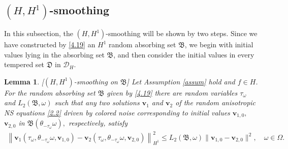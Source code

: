 \documentclass{elsarticle}
\newtheorem{lemma}[theorem]{Lemma}
\theoremstyle{definition}
\numberwithin{equation}{section}
\newcommand{\D}{\mathcal{D}}
\begin{document}
\subsection{$(H,H^1)$-smoothing}

In this subsection, the $(H,H^1)$-smoothing will be shown  by two steps. Since  we have constructed  by   \eqref{4.19} an $H^1$ random absorbing set $\mathfrak B$, we begin with initial values lying  in the absorbing set $\mathfrak B$, and then consider the  initial values  in every tempered set $\mathfrak D $ in $\D_H$.


\begin{lemma}\label{lemma5.2}[$(H,H^1)$-smoothing on $\mathfrak B$]
 Let Assumption \ref{assum} hold and $f\in H$. For   the random absorbing set $\mathfrak B$ given by \eqref{4.19}     there are  random variables $\tau_\omega$ and $L_2(\mathfrak B,\omega) $ such that any
 two solutions $\textbf{v}_1$ and $\textbf{v}_2$ of the random anisotropic  NS equations \eqref{2.2} driven by colored noise corresponding to initial values  $\textbf{v}_{1,0},$ $\textbf{v}_{2,0}$ in $ \mathfrak B( \theta_{- \tau_\omega}\omega),$   respectively,  satisfy
\begin{align}\label{mar18.9}
 \left \| \textbf{v}_1  (  \tau_\omega,\theta_{-\tau_\omega}\omega,  \textbf{v}_{1,0} )
 - \textbf{v}_2   ( \tau_\omega,\theta_{-\tau_\omega}\omega, \textbf{v}_{2,0} ) \right \|^2_{H^1}
 \leq L_2({\mathfrak B}, \omega) \|\textbf{v}_{1,0}-\textbf{v}_{2,0}\|^2  ,\quad \omega \in \Omega.
\end{align}
\end{lemma}
\end{document}
